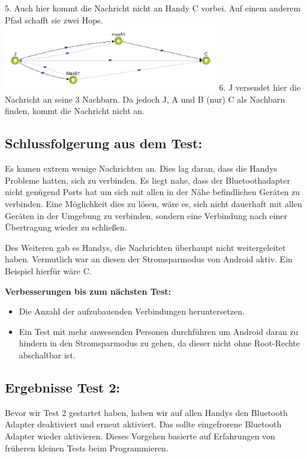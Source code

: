 5. Auch hier kommt die Nachricht nicht an Handy C vorbei. Auf einem
anderem Pfad schafft sie zwei Hops.
\includegraphics[width=0.7\textwidth]{belege/grosstests/Bilder/Miserfolg1.jpg} 6. J versendet
hier die Nachricht an seine 3 Nachbarn. Da jedoch J, A und B (nur) C als
Nachbarn finden, kommt die Nachricht nicht an.

\clearpage\subsection{Schlussfolgerung aus dem
Test:}\label{schlussfolgerung-aus-dem-test}

Es kamen extrem wenige Nachrichten an. Dies lag daran, dass die Handys
Probleme hatten, sich zu verbinden. Es liegt nahe, dass der
Bluetoothadapter nicht genügend Ports hat um sich mit allen in der Nähe
befindlichen Geräten zu verbinden. Eine Möglichkeit dies zu lösen, wäre
es, sich nicht dauerhaft mit allen Geräten in der Umgebung zu verbinden,
sondern eine Verbindung nach einer Übertragung wieder zu schließen.

Des Weiteren gab es Handys, die Nachrichten überhaupt nicht
weitergeleitet haben. Vermutlich war an diesen der Stromsparmodus von
Android aktiv. Ein Beispiel hierfür wäre C.

\textbf{Verbesserungen bis zum nächsten Test:}

\begin{itemize}
\tightlist
\item
  Die Anzahl der aufzubauenden Verbindungen heruntersetzen.
\item
  Ein Test mit mehr anwesenden Personen durchführen um Android daran zu
  hindern in den Stromsparmodus zu gehen, da dieser nicht ohne
  Root-Rechte abschaltbar ist.
\end{itemize}

\clearpage\subsection{Ergebnisse Test 2:}\label{ergebnisse-test-2}

Bevor wir Test 2 gestartet haben, haben wir auf allen Handys den
Bluetooth Adapter deaktiviert und erneut aktiviert. Das sollte
eingefrorene Bluetooth Adapter wieder aktivieren. Dieses Vorgehen
basierte auf Erfahrungen von früheren kleinen Tests beim Programmieren.

